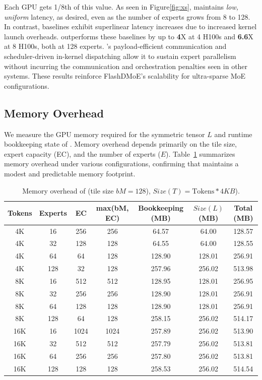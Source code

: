 Each GPU gets 1/8th of this value.
As seen in Figure\ref{fig:xs}, \sysname maintains \emph{low, uniform} latency, as desired,
even as the number of experts grows from 8 to 128.
In contrast, baselines exhibit superlinear latency increases due to increased kernel launch overheads.
\sysname outperforms these baselines by up to \textbf{4}X at 4 H100s and \textbf{6.6}X at 8 H100s, both at 128 experts.
\sysname’s payload-efficient communication and scheduler-driven
in-kernel dispatching allow it to sustain expert parallelism
without incurring the communication and orchestration penalties seen in other systems.
These results reinforce FlashDMoE’s scalability for ultra-sparse MoE configurations.

\subsection{Memory Overhead}\label{sec:eval:memory}
We measure the GPU memory required for the symmetric tensor $L$ and runtime bookkeeping state of \sysname.
Memory overhead depends primarily on the tile size, expert capacity (EC), and the number of experts ($E$).
Table~\ref{tab:memory-overhead} summarizes memory overhead under various configurations, confirming that \sysname maintains a modest and predictable memory footprint.
\begin{table}[!ht]
    \centering
    \caption{Memory overhead of \sysname (tile size $bM = 128$), $Size(T) = \text{Tokens} * 4KB$).}
    \label{tab:memory-overhead}
    \small
    \setlength{\tabcolsep}{5pt}
    \renewcommand{\arraystretch}{0.9}
    \begin{tabular}{ccccccc}
        \toprule
        \textbf{Tokens} & \textbf{Experts} & \textbf{EC} & \textbf{max(bM, EC)} & \textbf{Bookkeeping (MB)} & $Size(L)$ \textbf{(MB)} & \textbf{Total (MB)} \\
        \midrule
        4K  & 16  & 256  & 256  & 64.57  & 64.00  & 128.57 \\
        4K  & 32  & 128  & 128  & 64.55  & 64.00  & 128.55 \\
        4K  & 64  & 64   & 128  & 128.90 & 128.01 & 256.91 \\
        4K  & 128 & 32   & 128  & 257.96 & 256.02 & 513.98 \\
        \midrule
        8K  & 16  & 512  & 512  & 128.95 & 128.01 & 256.95 \\
        8K  & 32  & 256  & 256  & 128.90 & 128.01 & 256.91 \\
        8K  & 64  & 128  & 128  & 128.90 & 128.01 & 256.91 \\
        8K  & 128 & 64   & 128  & 258.15 & 256.02 & 514.17 \\
        \midrule
        16K & 16  & 1024 & 1024 & 257.89 & 256.02 & 513.90 \\
        16K & 32  & 512  & 512  & 257.79 & 256.02 & 513.81 \\
        16K & 64  & 256  & 256  & 257.80 & 256.02 & 513.81 \\
        16K & 128 & 128  & 128  & 258.53 & 256.02 & 514.54 \\
        \bottomrule
    \end{tabular}
    \vspace{-0.4cm}
\end{table}
